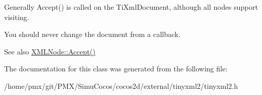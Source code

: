 Generally Accept() is called on the Ti\+Xml\+Document, although all nodes support visiting.

You should never change the document from a callback.

\begin{DoxySeeAlso}{See also}
\hyperlink{classtinyxml2_1_1XMLNode_a81e66df0a44c67a7af17f3b77a152785}{X\+M\+L\+Node\+::\+Accept()} 
\end{DoxySeeAlso}


The documentation for this class was generated from the following file\+:\begin{DoxyCompactItemize}
\item 
/home/pmx/git/\+P\+M\+X/\+Simu\+Cocos/cocos2d/external/tinyxml2/tinyxml2.\+h\end{DoxyCompactItemize}
